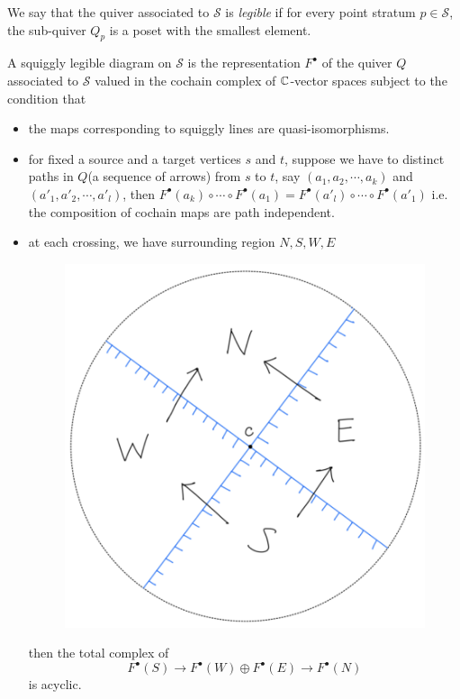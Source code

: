\begin{definition}
We say that the quiver associated to $\mathcal{S}$ is \emph{legible} if 
for every point stratum $p\in \mathcal{S}$, the sub-quiver $Q_p$ is a poset with the smallest element.
\end{definition}

\begin{definition}
A squiggly legible diagram on $\mathcal{S}$ is the representation $F^\bullet$ of the quiver $Q$ associated to $\mathcal{S}$ valued in the cochain complex of $\mathbb{C}$-vector spaces subject to the condition that
\begin{itemize}
\item the maps corresponding to squiggly lines are quasi-isomorphisms.

\item for fixed a source and a target vertices $s$ and $t$, suppose we have to distinct paths in $Q$(a sequence of arrows) from $s$ to $t$, say $(a_1,a_2,\cdots,a_k)$ and $(a'_1,a'_2,\cdots,a'_l)$, then $F^\bullet(a_k)\circ \cdots \circ F^\bullet(a_1) = F^\bullet(a'_l)\circ \cdots \circ F^\bullet(a'_1)$ i.e. the composition of cochain maps are path independent.

\item at each crossing, we have surrounding region $N,S,W,E$
\begin{figure}[H] 
    \centering
    \includegraphics[scale = 0.95]{diagrams/intro/2.png}
    \caption{}
    \label{fig:your-label}
\end{figure}
then the total complex of 
\[
F^\bullet(S) \rightarrow F^\bullet(W)\oplus F^\bullet(E) \rightarrow F^\bullet(N)
\]
is acyclic.
\end{itemize}
\end{definition}
